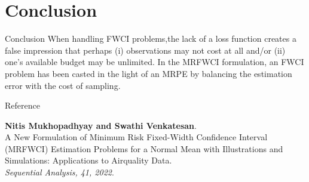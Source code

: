 \documentclass [xcolor=svgnames, t] {beamer}
\begin{document}
\section{Conclusion}
\begin{frame}{Conclusion}
\vspace{10mm}
When handling FWCI problems,the lack of a loss function creates a false impression that perhaps 
(i) observations may not cost at all and/or (ii) one's available budget may be unlimited. 
In the MRFWCI formulation, an FWCI problem has been casted in the light of an MRPE by balancing the estimation error with the cost of sampling.
\end{frame}

\begin{frame}{Reference}
%
%

\textbf{Nitis Mukhopadhyay and Swathi Venkatesan}.\\
\vspace{0.2cm}
A New Formulation of Minimum Risk Fixed-Width Confidence Interval
(MRFWCI) Estimation Problems for a Normal Mean with Illustrations
and Simulations: Applications to Airquality Data.\\
\textit{Sequential Analysis, 41, 2022}.

\end{frame}
\end{document}
